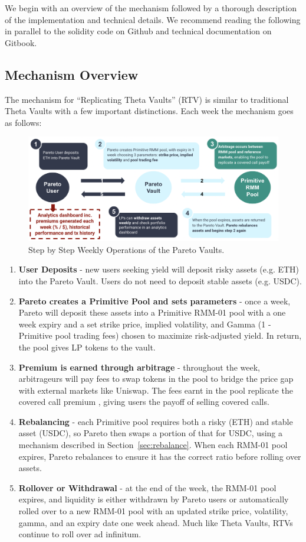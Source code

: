 \documentclass[hidelinks, 12pt]{article}
\begin{document}
We begin with an overview of the mechanism followed by a thorough description of the implementation and technical details. We recommend reading the following in parallel to the solidity code on Github and technical documentation on Gitbook.

\subsection{Mechanism Overview}

The mechanism for ``Replicating Theta Vaults'' (RTV) is similar to traditional Theta Vaults with a few important distinctions. Each week the mechanism goes as follows:
\begin{figure}[h!]
    \centering
    \includegraphics[width=0.8\linewidth]{userexperience.png}
    \caption{Step by Step Weekly Operations of the Pareto Vaults.}
    \label{fig:userexperience}
\end{figure}

\begin{enumerate}
    \item \textbf{User Deposits} - new users seeking yield will deposit risky assets (e.g. ETH) into the Pareto Vault. Users do not need to deposit stable assets (e.g. USDC).
    \item \textbf{Pareto creates a Primitive Pool and sets parameters} - once a week, Pareto will deposit these assets into a Primitive RMM-01 pool with a one week expiry and a set strike price, implied volatility, and Gamma (1 - Primitive pool trading fees) chosen to maximize risk-adjusted yield. In return, the pool gives LP tokens to the vault.
    \item \textbf{Premium is earned through arbitrage} - throughout the week, arbitrageurs will pay fees to swap tokens in the pool to bridge the price gap with external markets like Uniswap. The fees earnt in the pool replicate the covered call premium \cite{angeris2021replicating}, giving users the payoff of selling covered calls.
    \item \textbf{Rebalancing} - each Primitive pool requires both a risky (ETH) and stable asset (USDC), so Pareto then swaps a portion of that for USDC, using a mechanism described in Section~\ref{sec:rebalance}. When each RMM-01 pool expires, Pareto rebalances to ensure it has the correct ratio before rolling over assets.
    \item \textbf{Rollover or Withdrawal} - at the end of the week, the RMM-01 pool expires, and liquidity is either withdrawn by Pareto users or automatically rolled over to a new RMM-01 pool with an updated strike price, volatility, gamma, and an expiry date one week ahead. Much like Theta Vaults, RTVs continue to roll over ad infinitum.
\end{enumerate}
\end{document}
